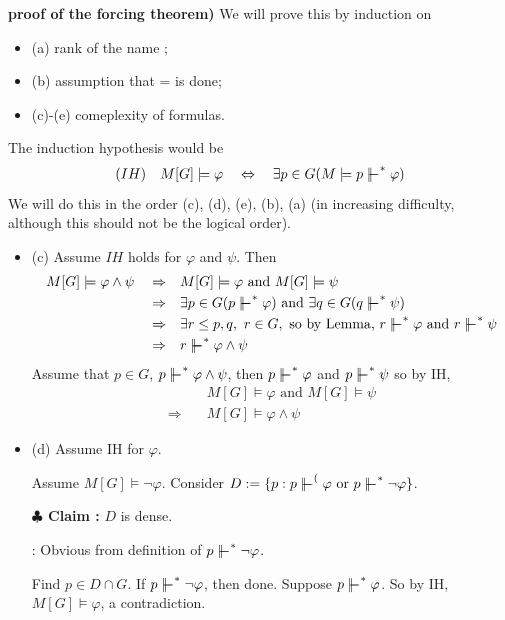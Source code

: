 \documentclass[12pt,a4paper]{article}
\newenvironment{proof}
{\begin{changemargin}{0.5cm}{0.5cm} 
	}%
	{\end{changemargin}
}
\newenvironment{subproof}
{\begin{changemargin}{0.5cm}{0.5cm} 
	}%
	{\end{changemargin}
}
\renewenvironment{i}
{\begin{itemize} 
	}%
	{\end{itemize}
}
\newenvironment{p}
{\begin{proof} 
	}%
	{\end{proof}
}
\begin{document}
\begin{p}
\textbf{proof of the forcing theorem)} We will prove this by induction on
\begin{i}
\item[(a)] rank of the name ;
\item[(b)] assumption that = is done;
\item[(c)-(e)] comeplexity of formulas.  
\end{i}
The induction hypothesis would be
\begin{align*}
(IH) \quad M[G] \models \varphi \quad \Leftrightarrow \quad \exists p \in G(M\models p\forces^* \varphi)
\end{align*}
We will do this in the order (c), (d), (e), (b), (a) (in increasing difficulty, although this should not be the logical order). 
\begin{i}
\item[(c)] Assume $IH$ holds for $\varphi$ and $\psi$. Then 
\begin{align*}
M[G] \models \varphi \wedge \psi \quad \Rightarrow \quad & M[G] \models \varphi \text{ and } M[G] \models \psi \\
\Rightarrow \quad & \exists p\in G (p\forces^* \varphi) \text{ and } \exists q\in G (q\forces^* \psi)  \\
\Rightarrow \quad & \exists r\leq p, q, \,\, r\in G, \text{ so by Lemma, }r\forces^* \varphi \text{ and } r\forces^* \psi\\
\Rightarrow \quad & r\forces^* \varphi \wedge \psi
\end{align*}
Assume that $p\in G$, $p \forces^* \varphi \wedge \psi$, then $p\forces^* \varphi$ and $p\forces^* \psi$ so by IH,
\begin{align*}
& M[G] \models \varphi \text{ and } M[G] \models \psi \\
\Rightarrow \quad & M[G] \models \varphi \wedge \psi
\end{align*}
\item[(d)] Assume IH for $\varphi$.

\quad Assume $M[G] \models \neg \varphi$. Consider $D:= \{p : p\forces^( \varphi \text{ or } p\forces^* \neg \varphi \}$.

\textbf{$\clubsuit$ Claim :} $D$ is dense.
\begin{subproof}
: Obvious from definition of $p\forces^* \neg \varphi$.
\end{subproof}
Find $p\in D\cap G$. If $p\forces^* \neg \varphi$, then done. Suppose $p\forces^* \varphi$. So by IH, $M[G] \models \varphi$, a contradiction.
\s


\end{i}
\end{p}
\end{document}
